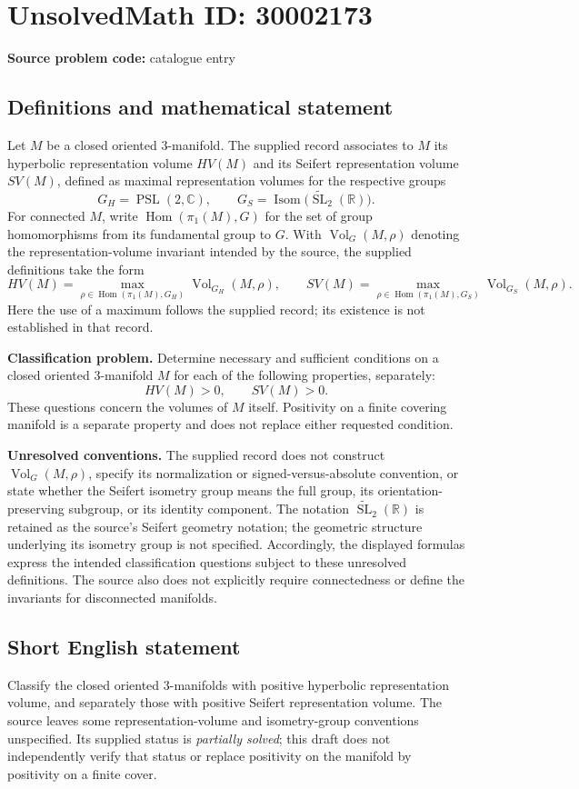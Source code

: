 \documentclass[11pt]{article}
\newcommand{\R}{\mathbb{R}}
\newcommand{\C}{\mathbb{C}}
\begin{document}
\section*{UnsolvedMath ID: 30002173}
\textbf{Source problem code:} catalogue entry
\subsection{Definitions and mathematical statement}
Let \(M\) be a closed oriented \(3\)-manifold. The supplied record associates to \(M\) its hyperbolic representation volume \(HV(M)\) and its Seifert representation volume \(SV(M)\), defined as maximal representation volumes for the respective groups
\[
G_H=\operatorname{PSL}(2,\C),\qquad
G_S=\operatorname{Isom}\bigl(\widetilde{\operatorname{SL}}_2(\R)\bigr).
\]
For connected \(M\), write \(\operatorname{Hom}(\pi_1(M),G)\) for the set of group homomorphisms from its fundamental group to \(G\). With \(\operatorname{Vol}_G(M,\rho)\) denoting the representation-volume invariant intended by the source, the supplied definitions take the form
\[
HV(M)=\max_{\rho\in\operatorname{Hom}(\pi_1(M),G_H)}\operatorname{Vol}_{G_H}(M,\rho),
\qquad
SV(M)=\max_{\rho\in\operatorname{Hom}(\pi_1(M),G_S)}\operatorname{Vol}_{G_S}(M,\rho).
\]
Here the use of a maximum follows the supplied record; its existence is not established in that record.

\textbf{Classification problem.} Determine necessary and sufficient conditions on a closed oriented \(3\)-manifold \(M\) for each of the following properties, separately:
\[
HV(M)>0,\qquad SV(M)>0.
\]
These questions concern the volumes of \(M\) itself. Positivity on a finite covering manifold is a separate property and does not replace either requested condition.

\textbf{Unresolved conventions.} The supplied record does not construct \(\operatorname{Vol}_G(M,\rho)\), specify its normalization or signed-versus-absolute convention, or state whether the Seifert isometry group means the full group, its orientation-preserving subgroup, or its identity component. The notation \(\widetilde{\operatorname{SL}}_2(\R)\) is retained as the source's Seifert geometry notation; the geometric structure underlying its isometry group is not specified. Accordingly, the displayed formulas express the intended classification questions subject to these unresolved definitions. The source also does not explicitly require connectedness or define the invariants for disconnected manifolds.
\subsection{Short English statement}
Classify the closed oriented \(3\)-manifolds with positive hyperbolic representation volume, and separately those with positive Seifert representation volume. The source leaves some representation-volume and isometry-group conventions unspecified. Its supplied status is \emph{partially solved}; this draft does not independently verify that status or replace positivity on the manifold by positivity on a finite cover.
\end{document}
